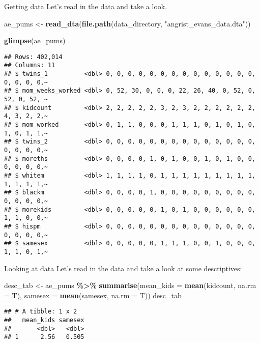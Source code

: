 \documentclass[
  ignorenonframetext,
]{beamer}
\newenvironment{Shaded}{\begin{snugshade}}{\end{snugshade}}
\newcommand{\AttributeTok}[1]{\textcolor[rgb]{0.13,0.29,0.53}{#1}}
\newcommand{\FunctionTok}[1]{\textcolor[rgb]{0.13,0.29,0.53}{\textbf{#1}}}
\newcommand{\NormalTok}[1]{#1}
\newcommand{\OtherTok}[1]{\textcolor[rgb]{0.56,0.35,0.01}{#1}}
\newcommand{\SpecialCharTok}[1]{\textcolor[rgb]{0.81,0.36,0.00}{\textbf{#1}}}
\newcommand{\StringTok}[1]{\textcolor[rgb]{0.31,0.60,0.02}{#1}}
\begin{document}
\begin{frame}[fragile]{Getting data}
\label{getting-data}
Let's read in the data and take a look.

\scriptsize

\begin{Shaded}
\begin{Highlighting}[]
\NormalTok{ae\_pums }\OtherTok{\textless{}{-}} \FunctionTok{read\_dta}\NormalTok{(}\FunctionTok{file.path}\NormalTok{(data\_directory, }\StringTok{"angrist\_evans\_data.dta"}\NormalTok{))}

\FunctionTok{glimpse}\NormalTok{(ae\_pums)}
\end{Highlighting}
\end{Shaded}

\begin{verbatim}
## Rows: 402,014
## Columns: 11
## $ twins_1          <dbl> 0, 0, 0, 0, 0, 0, 0, 0, 0, 0, 0, 0, 0, 0, 0, 0, 0, 0,~
## $ mom_weeks_worked <dbl> 0, 52, 30, 0, 0, 0, 22, 26, 40, 0, 52, 0, 52, 0, 52, ~
## $ kidcount         <dbl> 2, 2, 2, 2, 2, 3, 2, 3, 2, 2, 2, 2, 2, 2, 4, 3, 2, 2,~
## $ mom_worked       <dbl> 0, 1, 1, 0, 0, 0, 1, 1, 1, 0, 1, 0, 1, 0, 1, 0, 1, 1,~
## $ twins_2          <dbl> 0, 0, 0, 0, 0, 0, 0, 0, 0, 0, 0, 0, 0, 0, 0, 0, 0, 0,~
## $ moreths          <dbl> 0, 0, 0, 0, 1, 0, 1, 0, 0, 1, 0, 1, 0, 0, 0, 0, 0, 0,~
## $ whitem           <dbl> 1, 1, 1, 1, 0, 1, 1, 1, 1, 1, 1, 1, 1, 1, 1, 1, 1, 1,~
## $ blackm           <dbl> 0, 0, 0, 0, 1, 0, 0, 0, 0, 0, 0, 0, 0, 0, 0, 0, 0, 0,~
## $ morekids         <dbl> 0, 0, 0, 0, 0, 1, 0, 1, 0, 0, 0, 0, 0, 0, 1, 1, 0, 0,~
## $ hispm            <dbl> 0, 0, 0, 0, 0, 0, 0, 0, 0, 0, 0, 0, 0, 0, 0, 0, 0, 0,~
## $ samesex          <dbl> 0, 0, 0, 0, 0, 1, 1, 1, 0, 0, 1, 0, 0, 0, 1, 1, 0, 1,~
\end{verbatim}
\end{frame}

\begin{frame}[fragile]{Looking at data}
\label{looking-at-data}
Let's read in the data and take a look at some descriptives:

\scriptsize

\begin{Shaded}
\begin{Highlighting}[]
\NormalTok{desc\_tab }\OtherTok{\textless{}{-}}\NormalTok{ ae\_pums }\SpecialCharTok{\%\textgreater{}\%}
  \FunctionTok{summarise}\NormalTok{(}\AttributeTok{mean\_kids =} \FunctionTok{mean}\NormalTok{(kidcount, }\AttributeTok{na.rm =}\NormalTok{ T),}
            \AttributeTok{samesex =} \FunctionTok{mean}\NormalTok{(samesex, }\AttributeTok{na.rm =}\NormalTok{ T))}
\NormalTok{desc\_tab}
\end{Highlighting}
\end{Shaded}

\begin{verbatim}
## # A tibble: 1 x 2
##   mean_kids samesex
##       <dbl>   <dbl>
## 1      2.56   0.505
\end{verbatim}
\end{frame}
\end{document}

